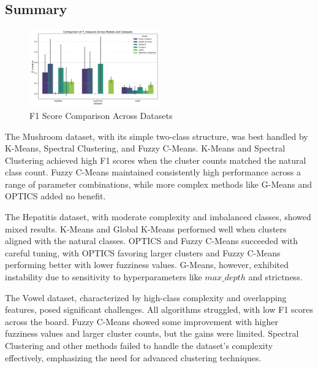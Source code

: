 \subsection{Summary}
\label{subsec:resultssummary}

\begin{figure}[h!]
    \centering
    \includegraphics[width=0.5\textwidth]{figures/model_comparison_f_measure.png}
    \caption{F1 Score Comparison Across Datasets}
    \label{fig:model_comparison_f_measure}
\end{figure}

The Mushroom dataset, with its simple two-class structure, was best handled by K-Means,
Spectral Clustering, and Fuzzy C-Means. K-Means and Spectral Clustering achieved high F1 
scores when the cluster counts matched the natural class count. Fuzzy C-Means maintained
consistently high performance across a range of parameter combinations, while more complex 
methods like G-Means and OPTICS added no benefit.

The Hepatitis dataset, with moderate complexity and imbalanced classes, showed mixed results.
K-Means and Global K-Means performed well when clusters aligned with the natural classes. 
OPTICS and Fuzzy C-Means succeeded with careful tuning, with OPTICS favoring larger clusters and Fuzzy C-Means performing better with lower fuzziness values.
G-Means, however, exhibited instability due to sensitivity to hyperparameters like $max\_depth$ and strictness.

The Vowel dataset, characterized by high-class complexity and overlapping 
features, posed significant challenges. All algorithms struggled, with low F1 
scores across the board. Fuzzy C-Means showed some improvement with higher fuzziness 
values and larger cluster counts, but the gains were limited. Spectral Clustering 
and other methods failed to handle the dataset's complexity effectively, emphasizing the need for advanced clustering techniques.